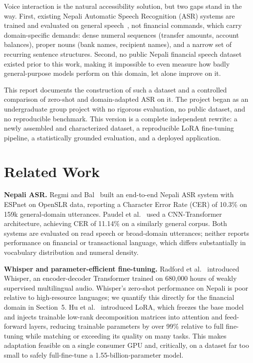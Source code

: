 \documentclass[11pt,a4paper]{article}
\begin{document}
Voice interaction is the natural accessibility solution, but two gaps stand
in the way. First, existing Nepali Automatic Speech Recognition (ASR)
systems are trained and evaluated on general speech~\cite{regmi2021,
paudel2023}, not financial commands, which carry domain-specific demands:
dense numeral sequences (transfer amounts, account balances), proper nouns
(bank names, recipient names), and a narrow set of recurring sentence
structures. Second, no public Nepali financial speech dataset existed prior
to this work, making it impossible to even measure how badly general-purpose
models perform on this domain, let alone improve on it.

This report documents the construction of such a dataset and a controlled
comparison of zero-shot and domain-adapted ASR on it. The project began as
an undergraduate group project with no rigorous evaluation, no public
dataset, and no reproducible benchmark. This version is a complete
independent rewrite: a newly assembled and characterized dataset, a
reproducible LoRA fine-tuning pipeline, a statistically grounded evaluation,
and a deployed application.

\section{Related Work}

\textbf{Nepali ASR.} Regmi and Bal~\cite{regmi2021} built an end-to-end
Nepali ASR system with ESPnet on OpenSLR data, reporting a Character Error
Rate (CER) of 10.3\% on 159k general-domain utterances. Paudel et
al.~\cite{paudel2023} used a CNN-Transformer architecture, achieving CER of
11.14\% on a similarly general corpus. Both systems are evaluated on
read speech or broad-domain utterances; neither reports performance on
financial or transactional language, which differs substantially in
vocabulary distribution and numeral density.

\textbf{Whisper and parameter-efficient fine-tuning.} Radford et
al.~\cite{radford2022} introduced Whisper, an encoder-decoder Transformer
trained on 680{,}000 hours of weakly supervised multilingual audio.
Whisper's zero-shot performance on Nepali is poor relative to
high-resource languages; we quantify this directly for the financial
domain in Section~5. Hu et al.~\cite{hu2022lora} introduced LoRA, which
freezes the base model and injects trainable low-rank decomposition
matrices into attention and feed-forward layers, reducing trainable
parameters by over 99\% relative to full fine-tuning while matching or
exceeding its quality on many tasks. This makes adaptation feasible on a
single consumer GPU and, critically, on a dataset far too small to safely
full-fine-tune a 1.55-billion-parameter model.
\end{document}
